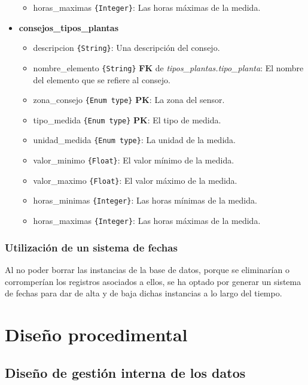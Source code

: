 \begin{itemize}
\begin{itemize}
                \item horas\_maximas \texttt{\{Integer\}}: Las horas máximas de la medida.
            \end{itemize}
            \item \textbf{consejos\_tipos\_plantas}
            \begin{itemize}
                \item descripcion \texttt{\{String\}}: Una descripción del consejo.
                \item nombre\_elemento \texttt{\{String\}} \textbf{FK} de \textit{tipos\_plantas.tipo\_planta}: El nombre del elemento que se refiere al consejo.
                \item zona\_consejo \texttt{\{Enum type\}} \textbf{PK}: La zona del sensor.
                \item tipo\_medida \texttt{\{Enum type\}} \textbf{PK}: El tipo de medida.
                \item unidad\_medida \texttt{\{Enum type\}}: La unidad de la medida.
                \item valor\_minimo \texttt{\{Float\}}: El valor mínimo de la medida.
                \item valor\_maximo \texttt{\{Float\}}: El valor máximo de la medida.
                \item horas\_minimas \texttt{\{Integer\}}: Las horas mínimas de la medida.
                \item horas\_maximas \texttt{\{Integer\}}: Las horas máximas de la medida.
            \end{itemize}
        \end{itemize}


    \subsubsection{Utilización de un sistema de fechas}
    Al no poder borrar las instancias de la base de datos, porque se eliminarían o corromperían los registros asociados a ellos, se ha optado por generar un sistema de fechas para dar de alta y de baja dichas instancias a lo largo del tiempo.

\section{Diseño procedimental}
    \subsection{Diseño de gestión interna de los datos}
    
